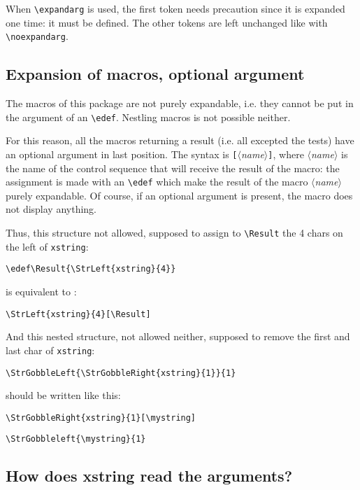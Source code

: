 \documentclass[english,a4paper,10pt]{article}
\newcommand\argu[1]{$\langle$\textit{#1}$\rangle$}
\newcommand\arguC[1]{\texttt{[}\argu{#1}\texttt{]}}
\newcommand\Xstring{\textsf{xstring}\xspace}
\newcommand\verbinline{\lstinline[basicstyle=\normalsize\ttfamily]}
\begin{document}
When \verbinline|\expandarg| is used, the first token needs precaution since it is expanded one time: it must be defined. The other tokens are left unchanged like with \verbinline|\noexpandarg|.

\subsection{Expansion of macros, optional argument}
\label{argumentoptionnel}
The macros of this package are not purely expandable, i.e. they cannot be put in the argument of an \verbinline|\edef|. Nestling macros is not possible neither.\medskip

For this reason, all the macros returning a result (i.e. all excepted the tests) have an optional argument in last position. The syntax is \arguC{name}, where \argu{name} is the name of the control sequence that will receive the result of the macro: the assignment is made with an \verbinline|\edef| which make the result of the macro \argu{name} purely expandable. Of course, if an optional argument is present, the macro does not display anything.\medskip

Thus, this structure not allowed, supposed to assign to \verb|\Result| the 4 chars on the left of \verb|xstring|:\par\nobreak
\hspace{0.2\linewidth}\verbinline|\edef\Result{\StrLeft{xstring}{4}}|\par\nobreak
\qquad is equivalent to :\par\nobreak
\hspace{0.2\linewidth}\verbinline|\StrLeft{xstring}{4}[\Result]|\medskip

And this nested structure, not allowed neither, supposed to remove the first and last char of \verb|xstring|:\par\nobreak
\hspace{0.2\linewidth}\verbinline|\StrGobbleLeft{\StrGobbleRight{xstring}{1}}{1}|\par\nobreak
\qquad should be written like this:\par\nobreak
\hspace{0.2\linewidth}\verbinline|\StrGobbleRight{xstring}{1}[\mystring]|\par\nobreak
\hspace{0.2\linewidth}\verbinline|\StrGobbleleft{\mystring}{1}|\par

\subsection{How does \Xstring read the arguments?}
\label{developpementarguments}
\end{document}
